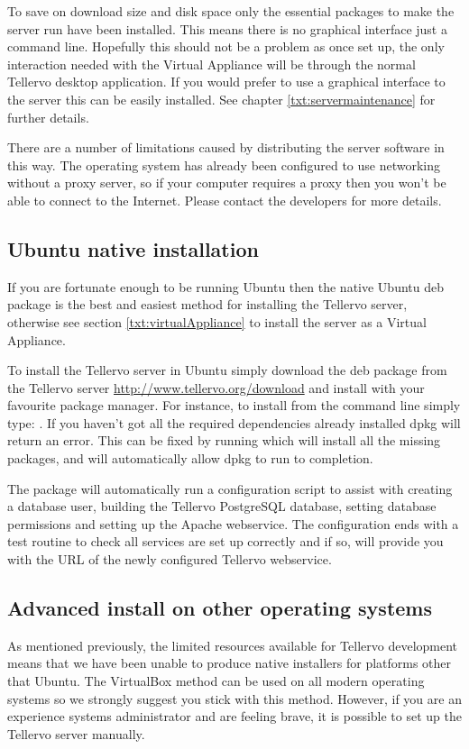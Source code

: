 To save on download size and disk space only the essential packages to make the server run have been installed.  This means there is no graphical interface just a command line.  Hopefully this should not be a problem as once set up, the only interaction needed with the Virtual Appliance will be through the normal Tellervo desktop application.  If you would prefer to use a graphical interface to the server this can be easily installed.  See chapter \ref{txt:servermaintenance} for further details.

There are a number of limitations caused by distributing the server software in this way. The operating system has already been configured to use networking without a proxy server, so if your computer requires a proxy then you won't be able to connect to the Internet.  Please contact the developers for more details.



\subsection{Ubuntu native installation}
\label{txt:installnativeserver}
If you are fortunate enough to be running Ubuntu then the native Ubuntu deb package is the best and easiest method for installing the Tellervo server, otherwise see section \ref{txt:virtualAppliance} to install the server as a Virtual Appliance.  

To install the Tellervo server in Ubuntu simply download the deb package from the Tellervo server \url{http://www.tellervo.org/download} and install with your favourite package manager.  For instance, to install from the command line simply type: .  If you haven't got all the required dependencies already installed dpkg will return an error.  This can be fixed by running  which will install all the missing packages, and will automatically allow dpkg to run to completion.  

The package will automatically run a configuration script to assist with creating a database user, building the Tellervo PostgreSQL database, setting database permissions and setting up the Apache webservice.  The configuration ends with a test routine to check all services are set up correctly and if so, will provide you with the URL of the newly configured Tellervo webservice.

\subsection{Advanced install on other operating systems}
\label{txt:installadvancedserver}
As mentioned previously, the limited resources available for Tellervo development means that we have been unable to produce native installers for platforms other that Ubuntu.  The VirtualBox method can be used on all modern operating systems so we strongly suggest you stick with this method.  However, if you are an experience systems administrator and are feeling brave, it is possible to set up the Tellervo server manually.  

